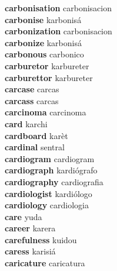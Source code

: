 \textbf{carbonisation } carbonisacion \\
\textbf{carbonise } karbonisá \\
\textbf{carbonization } carbonisacion \\
\textbf{carbonize } karbonisá \\
\textbf{carbonous } carbonico \\
\textbf{carburetor } karbureter \\
\textbf{carburettor } karbureter \\
\textbf{carcase } carcas \\
\textbf{carcass } carcas \\
\textbf{carcinoma } carcinoma \\
\textbf{card } karchi \\
\textbf{cardboard } karèt \\
\textbf{cardinal } sentral \\
\textbf{cardiogram } cardiogram \\
\textbf{cardiograph } kardiógrafo \\
\textbf{cardiography } cardiografia \\
\textbf{cardiologist } kardiólogo \\
\textbf{cardiology } cardiologia \\
\textbf{care } yuda \\
\textbf{career } karera \\
\textbf{carefulness } kuidou \\
\textbf{caress } karisiá \\
\textbf{caricature } caricatura \\
